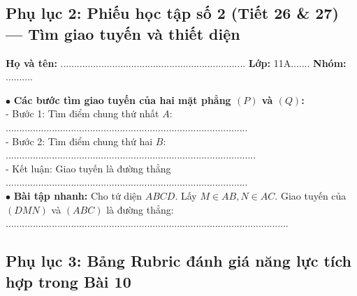 \documentclass[12pt, a4paper]{article}
\begin{document}
\subsection*{Phụ lục 2: Phiếu học tập số 2 (Tiết 26 \& 27) --- Tìm giao tuyến và thiết diện}
\noindent\textbf{Họ và tên:} .................................................................... \textbf{Lớp:} 11A....... \textbf{Nhóm:} ..........

\begin{pedabox}
$\bullet$ \textbf{Các bước tìm giao tuyến của hai mặt phẳng $(P)$ và $(Q)$:}\\
- Bước 1: Tìm điểm chung thứ nhất $A$: .........................................................................................\\
- Bước 2: Tìm điểm chung thứ hai $B$: ............................................................................................\\
- Kết luận: Giao tuyến là đường thẳng .........................................................................................\\[0.3em]
$\bullet$ \textbf{Bài tập nhanh:} Cho tứ diện $ABCD$. Lấy $M \in AB, N \in AC$. Giao tuyến của $(DMN)$ và $(ABC)$ là đường thẳng: ........................................................................................................
\end{pedabox}

\subsection*{Phụ lục 3: Bảng Rubric đánh giá năng lực tích hợp trong Bài 10}
\end{document}
